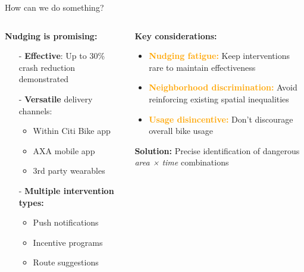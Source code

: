 \documentclass[aspectratio=169,xcolor={usenames,dvipsnames,svgnames,table},10pt,usepdftitle=false,hyperref={bookmarksdepth=3}]{beamer}
\begin{document}
\begin{frame}{How can we do something?}
    \begin{columns}
        \begin{column}{0.5\textwidth}
            \textbf{Nudging is promising:}
            
            \begin{itemize}
                \item[-] \textbf{Effective}: Up to 30\% crash reduction demonstrated
                \item[-] \textbf{Versatile} delivery channels:
                \begin{itemize}
                    \item Within Citi Bike app
                    \item AXA mobile app
                    \item 3rd party wearables
                \end{itemize}
                \item[-] \textbf{Multiple intervention types:}
                \begin{itemize}
                    \item Push notifications
                    \item Incentive programs
                    \item Route suggestions
                \end{itemize}
            \end{itemize}
        \end{column}
        
        \begin{column}{0.5\textwidth}
            \textbf{Key considerations:}
            \begin{itemize}
                \item \textcolor{orange}{\textbf{Nudging fatigue:}} Keep interventions rare to maintain effectiveness
                \item \textcolor{orange}{\textbf{Neighborhood discrimination:}} Avoid reinforcing existing spatial inequalities
                \item \textcolor{orange}{\textbf{Usage disincentive:}} Don't discourage overall bike usage
            \end{itemize}
            
            \vspace{0.3cm}
            
            \textbf{Solution:} Precise identification of dangerous \textit{area × time} combinations
        \end{column}
    \end{columns}
\end{frame}
\end{document}
